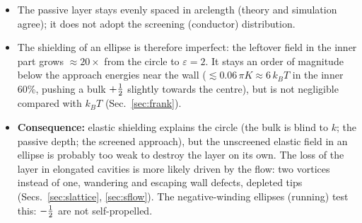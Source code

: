\begin{itemize}
  \item The passive layer stays evenly spaced in arclength (theory and simulation agree); it does not adopt the screening (conductor) distribution.
  \item The shielding of an ellipse is therefore imperfect: the leftover field in the inner part grows $\approx20\times$ from the circle to
        $\varepsilon=2$. It stays an order of magnitude below the approach energies near the wall ($\lesssim0.06\,\pi K\approx6\,k_BT$ in the inner 60\%, pushing a
        bulk $+\tfrac12$ slightly towards the centre), but is not negligible compared with $k_BT$ (Sec.~\ref{sec:frank}).
  \item \textbf{Consequence:} elastic shielding explains the circle (the bulk is blind to $k$; the passive depth; the screened approach), but the
        unscreened elastic field in an ellipse is probably too weak to destroy the layer on its own. The loss of the layer in elongated cavities is more
        likely driven by the flow: two vortices instead of one, wandering and escaping wall defects, depleted tips (Secs.~\ref{sec:slattice},
        \ref{sec:sflow}). The negative-winding ellipses (running) test this: $-\tfrac12$ are not self-propelled.
\end{itemize}
